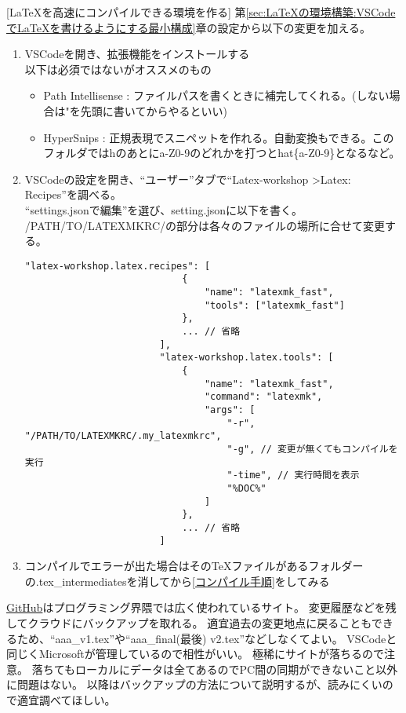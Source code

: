 \documentclass[uplatex, a4paper, dvipdfmx, 12pt]{jsreport}
\begin{document}
	[LaTeXを高速にコンパイルできる環境を作る]
		第\ref{sec:LaTeXの環境構築:VSCodeでLaTeXを書けるようにする最小構成}章の設定から以下の変更を加える。
		\begin{enumerate}
			\item VSCodeを開き、拡張機能をインストールする\\
					以下は必須ではないがオススメのもの
					\begin{itemize}
						\item Path Intellisense : ファイルパスを書くときに補完してくれる。(しない場合は"を先頭に書いてからやるといい)
						\item HyperSnips : 正規表現でスニペットを作れる。自動変換もできる。このフォルダではhのあとにa-Z0-9のどれかを打つと\tbs hat\{a-Z0-9\}となるなど。
					\end{itemize}
			\item VSCodeの設定を開き、``ユーザー''タブで``Latex-workshop \textgreater Latex: Recipes''を調べる。\\
					``settings.jsonで編集''を選び、setting.jsonに以下を書く。\\
					/PATH/TO/LATEXMKRC/の部分は各々のファイルの場所に合せて変更する。
					\begin{lstlisting}[gobble=12]
						"latex-workshop.latex.recipes": [
							{
								"name": "latexmk_fast",
								"tools": ["latexmk_fast"]
							},
							... // 省略
						],
						"latex-workshop.latex.tools": [
							{
								"name": "latexmk_fast",
								"command": "latexmk",
								"args": [
									"-r", "/PATH/TO/LATEXMKRC/.my_latexmkrc",
									"-g", // 変更が無くてもコンパイルを実行
									"-time", // 実行時間を表示
									"%DOC%"
								]
							},
							... // 省略
						]
					\end{lstlisting}
			\item コンパイルでエラーが出た場合はその\TeX ファイルがあるフォルダーの.tex\_intermediatesを消してから\ref{コンパイル手順}をしてみる
		\end{enumerate}

	\href{https://github.co.jp/}{GitHub}はプログラミング界隈では広く使われているサイト。
	変更履歴などを残してクラウドにバックアップを取れる。
	適宜過去の変更地点に戻ることもできるため、``aaa\_v1.tex''や``aaa\_final(最後) v2.tex''などしなくてよい。
	VSCodeと同じくMicrosoftが管理しているので相性がいい。
	極稀にサイトが落ちるので注意。
	落ちてもローカルにデータは全てあるのでPC間の同期ができないこと以外に問題はない。
	以降はバックアップの方法について説明するが、読みにくいので適宜調べてほしい。
\end{document}
